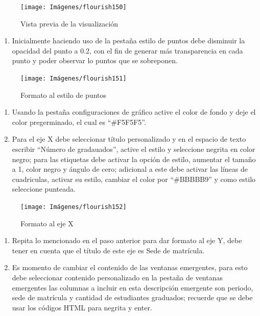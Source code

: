 \documentclass[
]{book}
\providecommand{\tightlist}{%
  \setlength{\itemsep}{0pt}\setlength{\parskip}{0pt}}
\begin{document}
\begin{figure}

{\centering \texttt{[image: Imágenes/flourish150]} 

}

\caption{Vista previa de la visualización}\label{fig:paso2puntosflourish-fig}
\end{figure}

\begin{enumerate}
\def\labelenumi{\arabic{enumi}.}
\setcounter{enumi}{2}
\tightlist
\item
  Inicialmente haciendo uso de la pestaña estilo de puntos debe disminuir la opacidad del punto a 0.2, con el fin de generar más transparencia en cada punto y poder observar lo puntos que se sobreponen.
\end{enumerate}

\begin{figure}

{\centering \texttt{[image: Imágenes/flourish151]} 

}

\caption{Formato al estilo de puntos}\label{fig:paso3puntosflourish-fig}
\end{figure}

\begin{enumerate}
\def\labelenumi{\arabic{enumi}.}
\setcounter{enumi}{3}
\item
  Usando la pestaña configuraciones de gráfico active el color de fondo y deje el color pregerminado, el cual es ``\#F5F5F5''.
\item
  Para el eje X debe seleccionar título personalizado y en el espacio de texto escribir ``Número de gradauados'', active el estilo y seleccione negrita en color negro; para las etiquetas debe activar la opción de estilo, aumentar el tamaño a 1, color negro y ángulo de cero; adicional a este debe activar las líneas de cuadriculas, activar su estilo, cambiar el color por ``\#BBBBB9'' y como estilo seleccione punteada.
\end{enumerate}

\begin{figure}

{\centering \texttt{[image: Imágenes/flourish152]} 

}

\caption{Formato al eje X}\label{fig:paso5puntosflourish-fig}
\end{figure}

\begin{enumerate}
\def\labelenumi{\arabic{enumi}.}
\setcounter{enumi}{5}
\item
  Repita lo mencionado en el paso anterior para dar formato al eje Y, debe tener en cuenta que el título de este eje es Sede de matrícula.
\item
  Es momento de cambiar el contenido de las ventanas emergentes, para esto debe seleccionar contenido personalizado en la pestaña de ventanas emergentes las columnas a incluir en esta descripción emergente son periodo, sede de matrícula y cantidad de estudiantes graduados; recuerde que se debe usar los códigos HTML para negrita y enter.
\end{enumerate}
\end{document}
